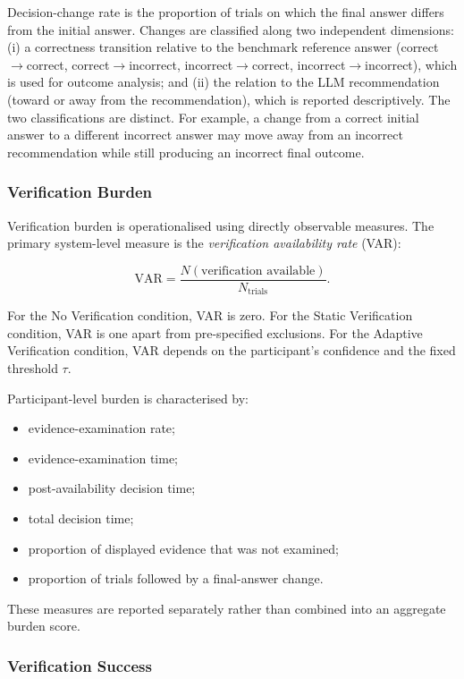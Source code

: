 \documentclass[oneside,final,14pt,a4paper]{extreport}
\begin{document}
Decision-change rate is the proportion of trials on which the final answer
differs from the initial answer. Changes are classified along two independent
dimensions: (i) a correctness transition relative to the benchmark reference
answer (correct$\to$correct, correct$\to$incorrect, incorrect$\to$correct,
incorrect$\to$incorrect), which is used for outcome analysis; and (ii) the
relation to the LLM recommendation (toward or away from the recommendation),
which is reported descriptively. The two classifications are distinct. For
example, a change from a correct initial answer to a different incorrect
answer may move away from an incorrect recommendation while still producing
an incorrect final outcome.

\subsubsection{Verification Burden}
\label{subsubsec:verification-burden}

Verification burden is operationalised using directly observable measures.
The primary system-level measure is the \emph{verification availability
rate} (VAR):

$$
\text{VAR}
=
\frac{
N(\text{verification available})
}{
N_{\text{trials}}
}.
$$

For the No Verification condition, VAR is zero. For the Static Verification
condition, VAR is one apart from pre-specified exclusions. For the Adaptive
Verification condition, VAR depends on the participant's confidence and the
fixed threshold $\tau$.

Participant-level burden is characterised by:

\begin{itemize}
\item evidence-examination rate;
\item evidence-examination time;
\item post-availability decision time;
\item total decision time;
\item proportion of displayed evidence that was not examined;
\item proportion of trials followed by a final-answer change.
\end{itemize}

These measures are reported separately rather than combined into an aggregate
burden score.

\subsubsection{Verification Success}
\label{subsubsec:verification-success}
\end{document}
